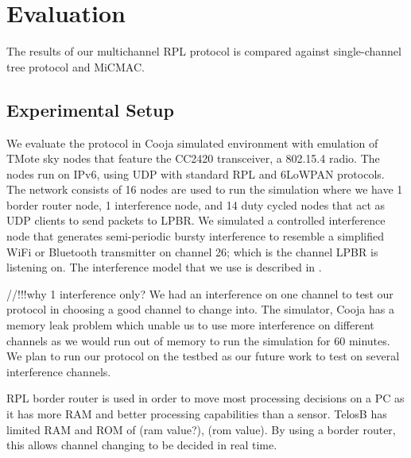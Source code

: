 \section{Evaluation}
The results of our multichannel RPL protocol is compared against single-channel tree protocol and MiCMAC.

\subsection{Experimental Setup}
We evaluate the protocol in Cooja simulated environment with emulation of TMote sky nodes that feature the CC2420 transceiver, a 802.15.4 radio. The nodes run on IPv6, using UDP with standard RPL and 6LoWPAN protocols. The network consists of 16 nodes are used to run the simulation where we have 1 border router node, 1 interference node, and 14 duty cycled nodes that act as UDP clients to send packets to LPBR. We simulated a controlled interference node that generates semi-periodic bursty interference to resemble a simplified WiFi or Bluetooth transmitter on channel 26; which is the channel LPBR is listening on. The interference model that we use is described in \cite{Boano:2010:MSM:2127940.2127963}. 

//!!!why 1 interference only?
We had an interference on one channel to test our protocol in choosing a good channel to change into. The simulator, Cooja has a memory leak problem which unable us to use more interference on different channels as we would run out of memory to run the simulation for 60 minutes. We plan to run our protocol on the testbed as our future work to test on several interference channels.

RPL border router is used in order to move most processing decisions on a PC as it has more RAM and better processing capabilities than a sensor. TelosB has limited RAM and ROM of (ram value?), (rom value). By using a border router, this allows channel changing to be decided in real time. 



